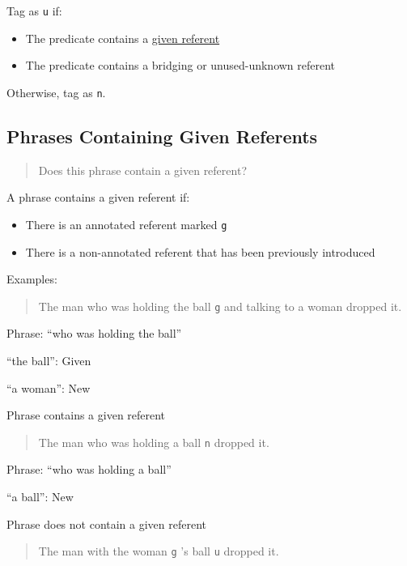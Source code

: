 \documentclass[
]{book}
\providecommand{\tightlist}{%
  \setlength{\itemsep}{0pt}\setlength{\parskip}{0pt}}
\begin{document}
Tag as \texttt{u} if:

\begin{itemize}
\tightlist
\item
  The predicate contains a \protect\hyperlink{phrases-containing-given-referents}{given referent}
\item
  The predicate contains a bridging or unused-unknown referent
\end{itemize}

Otherwise, tag as \texttt{n}.

\hypertarget{phrases-containing-given-referents}{%
\subsection{Phrases Containing Given Referents}\label{phrases-containing-given-referents}}

\begin{quote}
Does this phrase contain a given referent?
\end{quote}

A phrase contains a given referent if:

\begin{itemize}
\item
  There is an annotated referent marked \texttt{g}
\item
  There is a non-annotated referent that has been previously introduced
\end{itemize}

Examples:

\begin{quote}
The man who was holding the ball \texttt{g} and talking to a woman dropped it.
\end{quote}

Phrase: ``who was holding the ball''

``the ball'': Given

``a woman'': New

Phrase contains a given referent

\begin{quote}
The man who was holding a ball \texttt{n} dropped it.
\end{quote}

Phrase: ``who was holding a ball''

``a ball'': New

Phrase does not contain a given referent

\begin{quote}
The man with the woman \texttt{g} 's ball \texttt{u} dropped it.
\end{quote}
\end{document}
